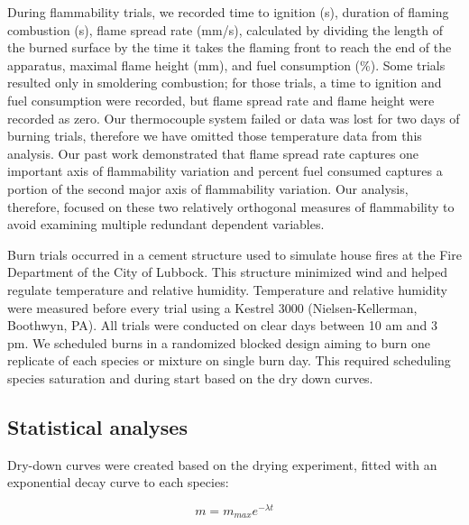 \documentclass[letterpaper,12pt]{article}
\begin{document}
During flammability trials, we recorded time to ignition (s), duration of
flaming combustion (s), flame spread rate (mm/s), calculated by dividing the
length of the burned surface by the time it takes the flaming front to reach
the end of the apparatus, maximal flame height (mm), and fuel consumption (\%).
Some trials resulted only in smoldering combustion; for those trials, a time to
ignition and fuel consumption were recorded, but flame spread rate and flame
height were recorded as zero. Our thermocouple system failed or data was lost
for two days of burning trials, therefore we have omitted those temperature
data from this analysis. Our past work \citep{Magalhaes+Schwilk-2012}
demonstrated that flame spread rate captures one important axis of flammability
variation \citep{Schwilk-2015, Pausas+Keeley+etal-2017, Prior+Murphy+etal-2018}
and percent fuel consumed captures a portion of the second major axis of
flammability variation. Our analysis, therefore, focused on these two
relatively orthogonal measures of flammability to avoid examining multiple
redundant dependent variables.

Burn trials occurred in a cement structure used to simulate house fires at the
Fire Department of the City of Lubbock. This structure minimized wind and
helped regulate temperature and relative humidity. Temperature and relative
humidity were measured before every trial using a Kestrel 3000
(Nielsen-Kellerman, Boothwyn, PA). All trials were conducted on clear days
between 10 am and 3 pm. We scheduled burns in a randomized blocked design
aiming to burn one replicate of each species or mixture on single burn day.
This required scheduling species saturation and during start based on the dry
down curves.

\subsection*{Statistical analyses}

Dry-down curves were created based on the drying experiment, fitted with an
exponential decay curve to each species:

\begin{equation}
m = m_{max} e^{-\lambda t}
\end{equation}
\end{document}

